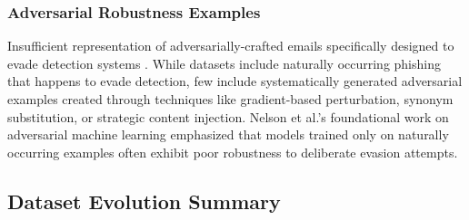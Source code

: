 \subsubsection{Adversarial Robustness Examples}

Insufficient representation of adversarially-crafted emails specifically designed to evade detection systems \cite{nelson2008adversarial}. While datasets include naturally occurring phishing that happens to evade detection, few include systematically generated adversarial examples created through techniques like gradient-based perturbation, synonym substitution, or strategic content injection. Nelson et al.'s foundational work on adversarial machine learning emphasized that models trained only on naturally occurring examples often exhibit poor robustness to deliberate evasion attempts.

\subsection{Dataset Evolution Summary}

